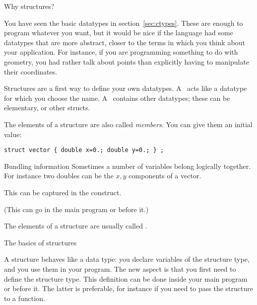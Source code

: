 
 {Why structures?}
\label{sec:struct}

You have seen the basic datatypes in section~\ref{sec:ctypes}. These
are enough to program whatever you want, but it would be nice if the
language had some datatypes that are more abstract, closer to the
terms in which you think about your application. For instance, if you
are programming something to do with geometry, you had rather talk
about points than explicitly having to manipulate their coordinates.

Structures are a
first way to define your own datatypes. A~
acts like a datatype for which you choose the name. A~
contains other datatypes; these can be elementary, or other structs.
%

The elements of a structure are also called
\emph{members}.
You can give them an initial value:
\begin{lstlisting}
struct vector { double x=0.; double y=0.; } ;
\end{lstlisting}
  
\begin{slide}{Bundling information}
  \label{sl:struct-why}
  Sometimes a number of variables belong logically together. For
  instance two doubles can be the $x,y$ components of a vector.

  This can be captured in the  construct.


  (This can go in the main program or before it.)

The elements of a structure are usually called .
\end{slide}

 {The basics of structures}

A structure behaves like a data type: you declare variables of the
structure type, and you use them in your program. The new aspect is
that you first need to define the structure type. This definition can
be done inside your main program or before it. The latter is
preferable, for instance if you need to pass the structure to a function.

